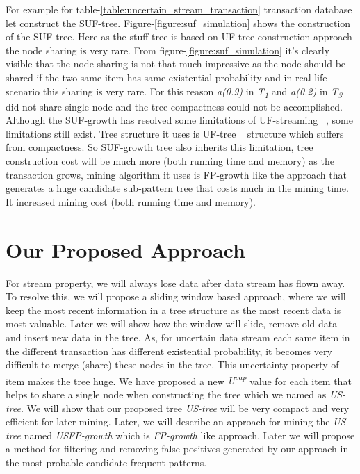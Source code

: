 \documentclass[conference]{IEEEtran}
\begin{document}
For example for table-\ref{table:uncertain_stream_transaction} transaction database let construct the SUF-tree. Figure-\ref{figure:suf_simulation} shows the construction of the SUF-tree. Here as the stuff tree is based on UF-tree construction approach the node sharing is very rare. From figure-\ref{figure:suf_simulation} it’s clearly visible that the node sharing is not that much impressive as the node should be shared if the two same item has same existential probability and in real life scenario this sharing is very rare. For this reason \emph{a(0.9)} in \emph{T\textsubscript{1}} and \emph{a(0.2)} in \emph{T\textsubscript{3}} did not share single node and the tree compactness could not be accomplished. Although the SUF-growth has resolved some limitations of UF-streaming ~\cite{suf_growth}, some limitations still exist. Tree structure it uses is UF-tree ~\cite{uf_growth} structure which suffers from compactness. So SUF-growth tree also inherits this limitation, tree construction cost will be much more (both running time and memory) as the transaction grows, mining algorithm it uses is FP-growth like the approach that generates a huge candidate sub-pattern tree that costs much in the mining time. It increased mining cost (both running time and memory).
    
\section{Our Proposed Approach}
For stream property, we will always lose data after data stream has flown away. To resolve this, we will propose a sliding window based approach, where we will keep the most recent information in a tree structure as the most recent data is most valuable. Later we will show how the window will slide, remove old data and insert new data in the tree. As, for uncertain data stream each same item in the different transaction has different existential probability, it becomes very difficult to merge (share) these nodes in the tree. This uncertainty property of item makes the tree huge. We have proposed a new \emph{U\textsuperscript{cap}} value for each item that helps to share a single node when constructing the tree which we named as \emph{US-tree}. We will show that our proposed tree \emph{US-tree} will be very compact and very efficient for later mining. Later, we will describe an approach for mining the \emph {US-tree} named \emph{USFP-growth} which is \emph{FP-growth} like approach. Later we will propose a method for filtering and removing false positives generated by our approach in the most probable candidate frequent patterns.
\end{document}
